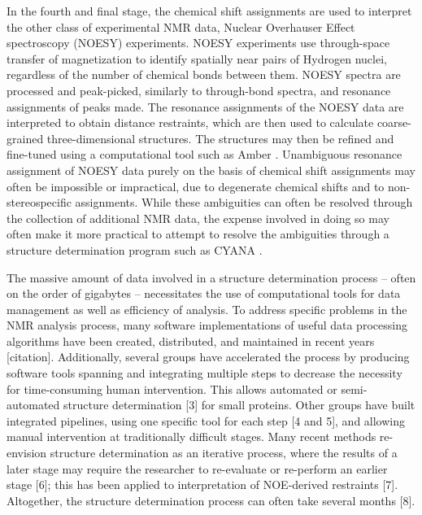 \documentclass[a4paper]{report}
\begin{document}
In the fourth and final stage, the chemical shift assignments are used to 
interpret the other class of experimental NMR data, Nuclear Overhauser Effect 
spectroscopy (NOESY) experiments.  NOESY experiments use through-space 
transfer of magnetization to identify spatially near pairs of Hydrogen nuclei, 
regardless of the number of chemical bonds between them.  NOESY spectra are 
processed and peak-picked, similarly to through-bond spectra, and resonance 
assignments of peaks made.  The resonance assignments of the NOESY data are 
interpreted to obtain distance restraints, which are then used to calculate 
coarse-grained three-dimensional structures.  The structures may then be 
refined and fine-tuned using a computational tool such as Amber \cite{amber}.  
Unambiguous resonance assignment of NOESY data purely on the basis of chemical 
shift assignments may often be impossible or impractical, due to degenerate 
chemical shifts and to non-stereospecific assignments.  While these 
ambiguities can often be resolved through the collection of additional 
NMR data, the expense involved in doing so may often make it more practical 
to attempt to resolve the ambiguities through a structure determination 
program such as CYANA \cite{cyana2004}.

The massive amount of data involved in a structure determination process --
often on the order of gigabytes -- necessitates the use of computational
tools for data management as well as efficiency of analysis.  To address
specific problems in the NMR analysis process, many software implementations 
of useful data processing algorithms have been created, distributed, and 
maintained in recent years [citation].  Additionally, several groups have 
accelerated the process by producing software tools spanning and integrating 
multiple steps to decrease the necessity for time-consuming human intervention.
This allows automated or semi-automated structure determination [3] for small 
proteins.  Other groups have built integrated pipelines, using one specific 
tool for each step [4 and 5], and allowing manual intervention at traditionally 
difficult stages.  Many recent methods re-envision structure determination 
as an iterative process, where the results of a later stage may require the 
researcher to re-evaluate or re-perform an earlier stage [6]; this has been 
applied to interpretation of NOE-derived restraints [7].  Altogether, the 
structure determination process can often take several months [8].
\end{document}
